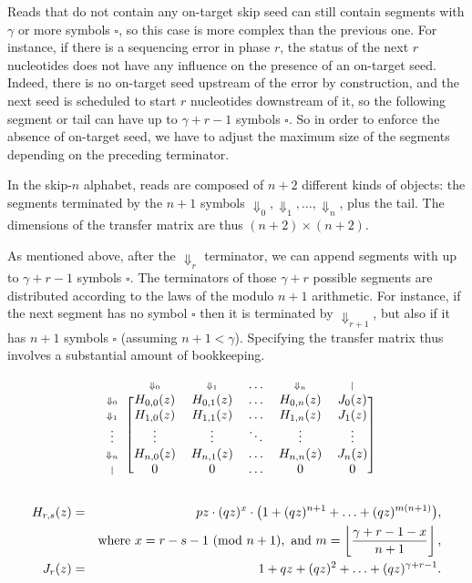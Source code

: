 \documentclass{article}
\newcommand{\Dn}[1]{\scriptstyle{\Downarrow_{#1}}}
\newcommand{\nd}{\scriptstyle{|}}
\newcommand{\modulo}[1]{\ (\mathrm{mod}\ #1)}
\begin{document}
Reads that do not contain any on-target skip seed can still contain
segments with $\gamma$ or more symbols $\square$, so this case is more
complex than the previous one. For instance, if there is a sequencing
error in phase $r$, the status of the next $r$ nucleotides does not have
any influence on the presence of an on-target seed. Indeed, there is no
on-target seed upstream of the error by construction, and the next seed is
scheduled to start $r$ nucleotides downstream of it, so the following
segment or tail can have up to $\gamma+r-1$ symbols $\square$. So in order
to enforce the absence of on-target seed, we have to adjust the maximum
size of the segments depending on the preceding terminator.

In the skip-$n$ alphabet, reads are composed of $n+2$ different kinds of
objects: the segments terminated by the $n+1$ symbols $\Downarrow_0,
\Downarrow_1, \ldots, \Downarrow_n$, plus the tail. The dimensions of the
transfer matrix are thus $(n+2) \times (n+2)$.

As mentioned above, after the $\Downarrow_r$ terminator, we can append
segments with up to $\gamma+r-1$ symbols $\square$. The terminators of
those $\gamma+r$ possible segments are distributed according to the laws
of the modulo $n+1$ arithmetic. For instance, if the next segment has no
symbol $\square$ then it is terminated by $\Downarrow_{r+1}$, but also if
it has $n+1$ symbols $\square$ (assuming $n+1 < \gamma$). Specifying the
transfer matrix thus involves a substantial amount of bookkeeping.

\begin{equation*}
\begin{blockarray}{cccccc}
   & \Dn{0} & \Dn{1} & \ldots & \Dn{n} & \nd \\
\begin{block}{c[ccccc]}
\Dn{0} & H_{0,0}(z) & H_{0,1}(z) & \ldots & H_{0,n}(z) & J_0(z) \\
\Dn{1} & H_{1,0}(z) & H_{1,1}(z) & \ldots & H_{1,n}(z) & J_1(z) \\
\vdots & \vdots & \vdots & \ddots & \vdots & \vdots \\
\Dn{n} & H_{n,0}(z) & H_{n,1}(z) & \ldots & H_{n,n}(z) & J_n(z) \\
\nd & 0 & 0 & \ldots & 0 & 0 \\
\end{block}
\end{blockarray}
\end{equation*}

\begin{eqnarray}
H_{r,s}(z) &=& pz \cdot (qz)^x \cdot \big( 1 + (qz)^{n+1} +
  \ldots + (qz)^{m(n+1)} \big), \\
\notag
  &\;& \text{where } x = r-s-1 \modulo{n+1},
  \text{ and } m = \left\lfloor
  \frac{\gamma+r-1-x}{n+1} \right\rfloor, \\
J_r(z) &=& 1 + qz + (qz)^2 + \ldots + (qz)^{\gamma+r-1}.
\end{eqnarray}
\end{document}
